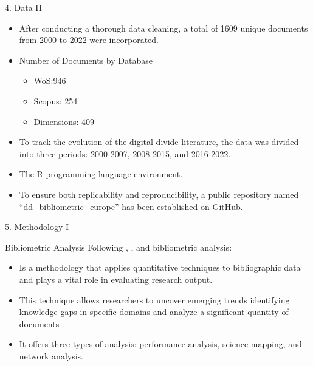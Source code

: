 \documentclass[
  ignorenonframetext,
]{beamer}
\providecommand{\tightlist}{%
  \setlength{\itemsep}{0pt}\setlength{\parskip}{0pt}}
\begin{document}
\begin{frame}{4. Data II}
\protect\hypertarget{data-ii}{}
\begin{itemize}
\item
  After conducting a thorough data cleaning, a total of 1609 unique
  documents from 2000 to 2022 were incorporated.
\item
  Number of Documents by Database

  \begin{itemize}
  \tightlist
  \item
    WoS:946
  \item
    Scopus: 254
  \item
    Dimensions: 409
  \end{itemize}
\item
  To track the evolution of the digital divide literature, the data was
  divided into three periods: 2000-2007, 2008-2015, and 2016-2022.
\item
  The R programming language environment.
\item
  To ensure both replicability and reproducibility, a public repository
  named ``dd\_bibliometric\_europe'' has been established on GitHub.
\end{itemize}
\end{frame}

\begin{frame}{5. Methodology I}
\protect\hypertarget{methodology-i}{}
\begin{block}{Bibliometric Analysis}
\protect\hypertarget{bibliometric-analysis}{}
Following \citet{donthu2021}, \citet{Aria2017}, \citet{ellegaard2015}
and \citet{Bornmann2015} bibliometric analysis:

\begin{itemize}
\tightlist
\item
  Is a methodology that applies quantitative techniques to bibliographic
  data and plays a vital role in evaluating research output.
\item
  This technique allows researchers to uncover emerging trends
  identifying knowledge gaps in specific domains and analyze a
  significant quantity of documents .
\item
  It offers three types of analysis: performance analysis, science
  mapping, and network analysis.
\end{itemize}
\end{block}
\end{frame}
\end{document}
